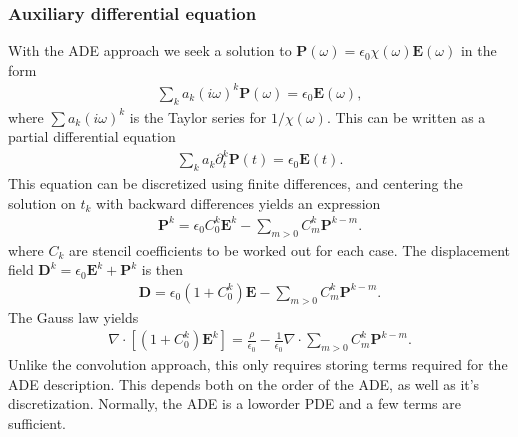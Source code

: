 \documentclass[letterpaper,10pt,english]{sphinxmanual}
\begin{document}
\subsubsection{Auxiliary differential equation}
\label{\detokenize{Solvers/Electrostatics:auxiliary-differential-equation}}
With the ADE approach we seek a solution to \(\mathbf{P}(\omega) = \epsilon_0\chi(\omega)\mathbf{E}(\omega)\) in the form
\begin{equation*}
\begin{split}\sum_k a_k(i\omega)^k\mathbf{P}(\omega) = \epsilon_0\mathbf{E}(\omega),\end{split}
\end{equation*}
where \(\sum a_k(i\omega)^k\) is the Taylor series for \(1/\chi(\omega)\).
This can be written as a partial differential equation
\begin{equation*}
\begin{split}\sum_{k}a_k\partial_t^k\mathbf{P}(t) = \epsilon_0\mathbf{E}(t).\end{split}
\end{equation*}
This equation can be discretized using finite differences, and centering the solution on \(t_k\) with backward differences yields an expression
\begin{equation*}
\begin{split}\mathbf{P}^k = \epsilon_0C_0^k\mathbf{E}^k - \sum_{m>0} C_m^k\mathbf{P}^{k-m}.\end{split}
\end{equation*}
where \(C_k\) are stencil coefficients to be worked out for each case.
The displacement field \(\mathbf{D}^k = \epsilon_0 \mathbf{E}^k + \mathbf{P}^k\) is then
\begin{equation*}
\begin{split}\mathbf{D} = \epsilon_0(1 + C_0^k)\mathbf{E} - \sum_{m>0} C_m^k\mathbf{P}^{k-m}.\end{split}
\end{equation*}
The Gauss law yields
\begin{equation*}
\begin{split}\nabla\cdot\left[\left(1 + C_0^k\right)\mathbf{E}^k\right] = \frac{\rho}{\epsilon_0} - \frac{1}{\epsilon_0}\nabla\cdot\sum_{m>0} C_m^k\mathbf{P}^{k-m}.\end{split}
\end{equation*}
Unlike the convolution approach, this only requires storing terms required for the ADE description.
This depends both on the order of the ADE, as well as it’s discretization.
Normally, the ADE is a low\sphinxhyphen{}order PDE and a few terms are sufficient.
\end{document}
